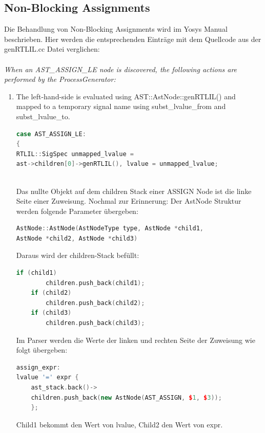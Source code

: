 \documentclass[11pt]{report}
\begin{document}

\subsection{Non-Blocking Assignments}

Die Behandlung von Non-Blocking Assignments wird im Yosys Manual beschrieben. Hier werden die entsprechenden Einträge mit dem Quellcode aus der genRTLIL.cc Datei verglichen:
\\
\\
\textit{
When an AST\_ASSIGN\_LE node is discovered, the following actions are performed by the ProcessGenerator:
}
\begin{enumerate}
  \item The left-hand-side is evaluated using AST::AstNode::genRTLIL() and mapped to a temporary signal name using subst\_lvalue\_from and subst\_lvalue\_to.
  \begin{lstlisting}[language=C++]
case AST_ASSIGN_LE:
{
RTLIL::SigSpec unmapped_lvalue = 
ast->children[0]->genRTLIL(), lvalue = unmapped_lvalue;
	
  \end{lstlisting}
Das nullte Objekt auf dem children Stack einer ASSIGN Node ist die linke Seite einer Zuweisung.
Nochmal zur Erinnerung: Der AstNode Struktur werden folgende Parameter übergeben:
\begin{lstlisting}[language=C++]
AstNode::AstNode(AstNodeType type, AstNode *child1, 
AstNode *child2, AstNode *child3)
\end{lstlisting}

Daraus wird der children-Stack befüllt:
\begin{lstlisting}[language=C++]
	if (child1)
		children.push_back(child1);
	if (child2)
		children.push_back(child2);
	if (child3)
		children.push_back(child3);
\end{lstlisting}
 
Im Parser werden die Werte der linken und rechten Seite der Zuweisung wie folgt übergeben:
\begin{lstlisting}[language=C++]
assign_expr:
lvalue '=' expr {
	ast_stack.back()->
	children.push_back(new AstNode(AST_ASSIGN, $1, $3));
	};	
\end{lstlisting}

Child1 bekommt den Wert von lvalue, Child2 den Wert von expr.


\end{enumerate}
\end{document}
